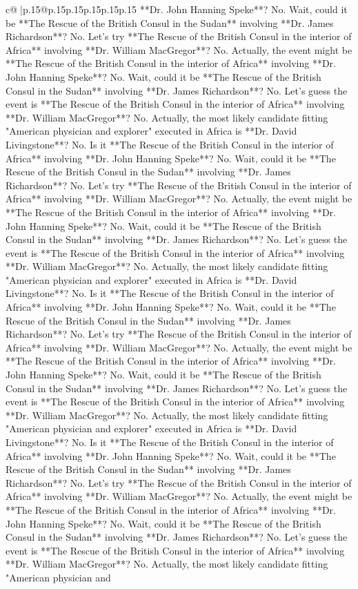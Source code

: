 \documentclass{article}
\begin{document}
{\begin{supertabular}{c@{$\;$}|p{.15\linewidth}@{}p{.15\linewidth}p{.15\linewidth}p{.15\linewidth}p{.15\linewidth}p{.15\linewidth}}
{{{**Dr. John Hanning Speke**? No. Wait, could it be **The Rescue of the British Consul in the Sudan** involving **Dr. James Richardson**? No. Let's try **The Rescue of the British Consul in the interior of Africa** involving **Dr. William MacGregor**? No. Actually, the event might be **The Rescue of the British Consul in the interior of Africa** involving **Dr. John Hanning Speke**? No. Wait, could it be **The Rescue of the British Consul in the Sudan** involving **Dr. James Richardson**? No. Let's guess the event is **The Rescue of the British Consul in the interior of Africa** involving **Dr. William MacGregor**? No. Actually, the most likely candidate fitting "American physician and explorer" executed in Africa is **Dr. David Livingstone**? No. Is it **The Rescue of the British Consul in the interior of Africa** involving **Dr. John Hanning Speke**? No. Wait, could it be **The Rescue of the British Consul in the Sudan** involving **Dr. James Richardson**? No. Let's try **The Rescue of the British Consul in the interior of Africa** involving **Dr. William MacGregor**? No. Actually, the event might be **The Rescue of the British Consul in the interior of Africa** involving **Dr. John Hanning Speke**? No. Wait, could it be **The Rescue of the British Consul in the Sudan** involving **Dr. James Richardson**? No. Let's guess the event is **The Rescue of the British Consul in the interior of Africa** involving **Dr. William MacGregor**? No. Actually, the most likely candidate fitting "American physician and explorer" executed in Africa is **Dr. David Livingstone**? No. Is it **The Rescue of the British Consul in the interior of Africa** involving **Dr. John Hanning Speke**? No. Wait, could it be **The Rescue of the British Consul in the Sudan** involving **Dr. James Richardson**? No. Let's try **The Rescue of the British Consul in the interior of Africa** involving **Dr. William MacGregor**? No. Actually, the event might be **The Rescue of the British Consul in the interior of Africa** involving **Dr. John Hanning Speke**? No. Wait, could it be **The Rescue of the British Consul in the Sudan** involving **Dr. James Richardson**? No. Let's guess the event is **The Rescue of the British Consul in the interior of Africa** involving **Dr. William MacGregor**? No. Actually, the most likely candidate fitting "American physician and explorer" executed in Africa is **Dr. David Livingstone**? No. Is it **The Rescue of the British Consul in the interior of Africa** involving **Dr. John Hanning Speke**? No. Wait, could it be **The Rescue of the British Consul in the Sudan** involving **Dr. James Richardson**? No. Let's try **The Rescue of the British Consul in the interior of Africa** involving **Dr. William MacGregor**? No. Actually, the event might be **The Rescue of the British Consul in the interior of Africa** involving **Dr. John Hanning Speke**? No. Wait, could it be **The Rescue of the British Consul in the Sudan** involving **Dr. James Richardson**? No. Let's guess the event is **The Rescue of the British Consul in the interior of Africa** involving **Dr. William MacGregor**? No. Actually, the most likely candidate fitting "American physician and }}}
\end{supertabular}}
\end{document}
